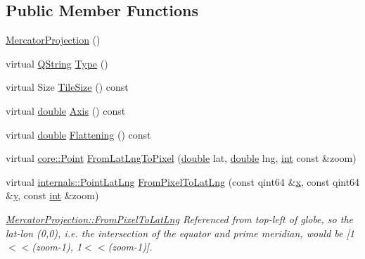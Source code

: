 \subsection*{Public Member Functions}
\begin{DoxyCompactItemize}
\item 
\hyperlink{group___o_p_map_widget_gacccd26328cbdd182922e0a0b2e265529}{Mercator\-Projection} ()
\item 
virtual \hyperlink{group___u_a_v_objects_plugin_gab9d252f49c333c94a72f97ce3105a32d}{Q\-String} \hyperlink{group___o_p_map_widget_gaefd6d064dd9c4c6cfc431ead163f706a}{Type} ()
\item 
virtual Size \hyperlink{group___o_p_map_widget_gab8dee05993ebd618b81c24cb3548076a}{Tile\-Size} () const 
\item 
virtual \hyperlink{_super_l_u_support_8h_a8956b2b9f49bf918deed98379d159ca7}{double} \hyperlink{group___o_p_map_widget_ga982d1100874717420bf3ab65e74c9c9d}{Axis} () const 
\item 
virtual \hyperlink{_super_l_u_support_8h_a8956b2b9f49bf918deed98379d159ca7}{double} \hyperlink{group___o_p_map_widget_ga85c35978f6b64944591d25a095fc8e4d}{Flattening} () const 
\item 
virtual \hyperlink{structcore_1_1_point}{core\-::\-Point} \hyperlink{group___o_p_map_widget_ga4e5e9d139c245de8a1278e83746ed240}{From\-Lat\-Lng\-To\-Pixel} (\hyperlink{_super_l_u_support_8h_a8956b2b9f49bf918deed98379d159ca7}{double} lat, \hyperlink{_super_l_u_support_8h_a8956b2b9f49bf918deed98379d159ca7}{double} lng, \hyperlink{ioapi_8h_a787fa3cf048117ba7123753c1e74fcd6}{int} const \&zoom)
\item 
virtual \hyperlink{structinternals_1_1_point_lat_lng}{internals\-::\-Point\-Lat\-Lng} \hyperlink{group___o_p_map_widget_gaaa80928cf51f4c3a7e860678a7bf51ee}{From\-Pixel\-To\-Lat\-Lng} (const qint64 \&\hyperlink{glext_8h_a1db9d104e3c2128177f26aff7b46982f}{x}, const qint64 \&\hyperlink{glext_8h_a42315f3ed8fff752bb47fd782309fcfc}{y}, const \hyperlink{ioapi_8h_a787fa3cf048117ba7123753c1e74fcd6}{int} \&zoom)
\begin{DoxyCompactList}\small\item\em \hyperlink{group___o_p_map_widget_gaaa80928cf51f4c3a7e860678a7bf51ee}{Mercator\-Projection\-::\-From\-Pixel\-To\-Lat\-Lng} Referenced from top-\/left of globe, so the lat-\/lon (0,0), i.\-e. the intersection of the equator and prime meridian, would be \mbox{[}1$<$$<$(zoom-\/1), 1$<$$<$(zoom-\/1)\mbox{]}. \end{DoxyCompactList}\item 

\end{DoxyCompactItemize}
